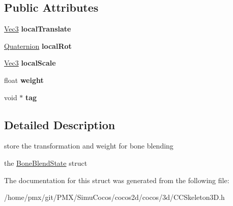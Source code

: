 \subsection*{Public Attributes}
\begin{DoxyCompactItemize}
\item 
\mbox{\label{structBone3D_1_1BoneBlendState_a2ee94ce4cc7b7b35332949ba15532a21}} 
\hyperlink{classVec3}{Vec3} {\bfseries local\+Translate}
\item 
\mbox{\label{structBone3D_1_1BoneBlendState_a576d8dea154696924499ce7aafab9f4c}} 
\hyperlink{classQuaternion}{Quaternion} {\bfseries local\+Rot}
\item 
\mbox{\label{structBone3D_1_1BoneBlendState_ab8a563b0b3c981aae3fb908ba9cd99fa}} 
\hyperlink{classVec3}{Vec3} {\bfseries local\+Scale}
\item 
\mbox{\label{structBone3D_1_1BoneBlendState_ab21f01bff12b885a141881c44ec2ac76}} 
float {\bfseries weight}
\item 
\mbox{\label{structBone3D_1_1BoneBlendState_a7f0d9b0b125cbd6e8d1e12fa1dd41d6e}} 
void $\ast$ {\bfseries tag}
\end{DoxyCompactItemize}


\subsection{Detailed Description}
store the transformation and weight for bone blending 

the \hyperlink{structBone3D_1_1BoneBlendState}{Bone\+Blend\+State} struct 

The documentation for this struct was generated from the following file\+:\begin{DoxyCompactItemize}
\item 
/home/pmx/git/\+P\+M\+X/\+Simu\+Cocos/cocos2d/cocos/3d/C\+C\+Skeleton3\+D.\+h\end{DoxyCompactItemize}
